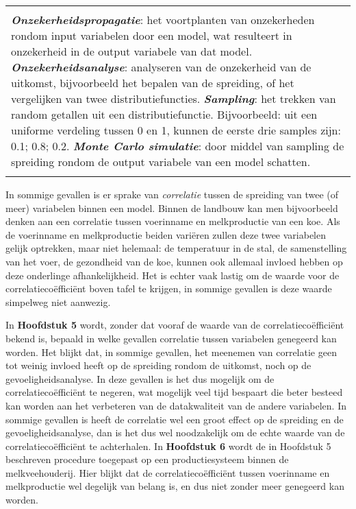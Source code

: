 \documentclass[12pt]{amsart}
\begin{document}
{{\vspace{0.5cm}
\footnotesize{
\begin{tabular}{|p{}|}
\hline
\mbox{}\\
\textit{\textbf{Onzekerheidspropagatie}}: het voortplanten van onzekerheden rondom input variabelen door een model, wat resulteert in onzekerheid in de output variabele van dat model. 
\textit{\textbf{Onzekerheidsanalyse}}: analyseren van de onzekerheid van de uitkomst, bijvoorbeeld het bepalen van de spreiding, of het vergelijken van twee distributiefuncties.
\textit{\textbf{Sampling}}: het trekken van random getallen uit een distributiefunctie. Bijvoorbeeld: uit een uniforme verdeling tussen 0 en 1, kunnen de eerste drie samples zijn: 0.1; 0.8; 0.2.
\textit{\textbf{Monte Carlo simulatie}}: door middel van sampling de spreiding rondom de output variabele van een model schatten. \\ \mbox{}\\ \hline
\end{tabular}}
\vspace{0.5cm}

\normalsize{
In sommige gevallen is er sprake van \textit{correlatie} tussen de spreiding van twee (of meer) variabelen binnen een model. Binnen de landbouw kan men bijvoorbeeld denken aan een correlatie tussen voerinname en melkproductie van een koe. Als de voerinname en melkproductie beiden vari\"{e}ren zullen deze twee variabelen gelijk optrekken, maar niet helemaal: de temperatuur in de stal, de samenstelling van het voer, de gezondheid van de koe, kunnen ook allemaal invloed hebben op deze onderlinge afhankelijkheid.  Het is echter vaak lastig om de waarde voor de correlatieco\"{e}ffici\"{e}nt boven tafel te krijgen, in sommige gevallen is deze waarde simpelweg niet aanwezig. 

In \textbf{Hoofdstuk 5} wordt, zonder dat vooraf de waarde van de correlatieco\"{e}ffici\"{e}nt  bekend is, bepaald in welke gevallen correlatie tussen variabelen genegeerd kan worden. Het blijkt dat, in sommige gevallen, het meenemen van correlatie geen tot weinig invloed heeft op de spreiding rondom de uitkomst, noch op de gevoeligheidsanalyse. In deze gevallen is het dus mogelijk om de correlatieco\"{e}ffici\"{e}nt te negeren, wat mogelijk veel tijd bespaart die beter besteed kan worden aan het verbeteren van de datakwaliteit van de andere variabelen. In sommige gevallen is heeft de correlatie wel een groot effect op de spreiding en de gevoeligheidsanalyse, dan is het dus wel noodzakelijk om de echte waarde van de correlatieco\"{e}ffici\"{e}nt  te achterhalen. In \textbf{Hoofdstuk 6} wordt de in Hoofdstuk 5 beschreven procedure toegepast op een productiesysteem binnen de melkveehouderij. Hier blijkt dat de correlatieco\"{e}ffici\"{e}nt tussen voerinname en melkproductie wel degelijk van belang is, en dus niet zonder meer genegeerd kan worden. 

}}}
\end{document}
